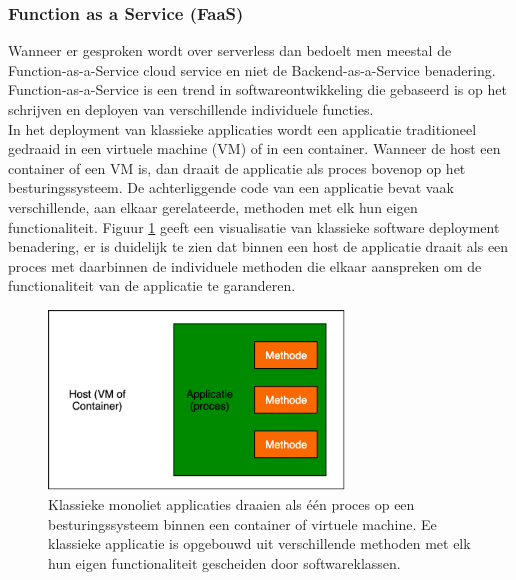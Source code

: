 \subsubsection{Function as a Service (FaaS)}
Wanneer er gesproken wordt over serverless dan bedoelt men meestal de Function-as-a-Service cloud service en niet de Backend-as-a-Service benadering.  Function-as-a-Service is een trend in softwareontwikkeling die gebaseerd is op het schrijven en deployen van verschillende individuele functies.  
\\
In het deployment van klassieke applicaties wordt een applicatie traditioneel gedraaid in een virtuele machine (VM) of in een container. Wanneer de host een container of een VM is, dan draait de applicatie als proces bovenop op het besturingssysteem. De achterliggende code van een applicatie bevat vaak verschillende, aan elkaar gerelateerde, methoden met elk hun eigen functionaliteit.  Figuur \ref{fig:traditional-software-deployment} geeft een visualisatie van klassieke software deployment benadering, er is duidelijk te zien dat binnen een host de applicatie draait als een proces met daarbinnen de individuele methoden die elkaar aanspreken om de functionaliteit van de applicatie te garanderen.
\begin{figure}
    \includegraphics[width=0.7\textwidth]{img/traditional_software_deployment.png}
    \caption{Klassieke monoliet applicaties draaien als één proces op een besturingssysteem binnen een container of virtuele machine. Ee klassieke applicatie is opgebouwd uit verschillende methoden met elk hun eigen functionaliteit gescheiden door softwareklassen.} 
    \label{fig:traditional-software-deployment}  
\end{figure}
\\
